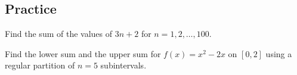 









\subsection{Practice}

\begin{exercise}

Find the sum of the values of \(3n+2\) for \(n=1,2, \dots ,100\).

\end{exercise}
\vspace*{6\baselineskip}

\begin{exercise}

Find the lower sum and the upper sum for \(f(x)=x^2-2x\) on \([0,2]\)
using a regular partition of \(n=5\) subintervals.

\end{exercise}
\vspace*{6\baselineskip}

